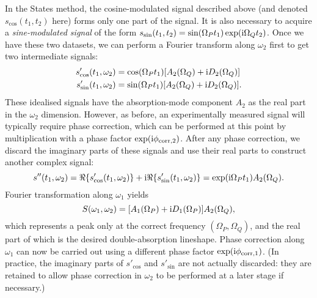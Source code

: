 In the States method, the cosine-modulated signal described above (and denoted $s_\text{cos}(t_1, t_2)$ here) forms only one part of the signal.
It is also necessary to acquire a \textit{sine-modulated signal} of the form $s_\text{sin}(t_1, t_2) = \sin(\Omega_P t_1)\exp(\mathrm{i}\Omega_Q t_2)$.
Once we have these two datasets, we can perform a Fourier transform along $\omega_2$ first to get two intermediate signals:
\begin{align}
    \label{eq:states_1}
    s'_\text{cos}(t_1, \omega_2) &= \cos(\Omega_P t_1) [A_2(\Omega_Q) + \mathrm{i} D_2(\Omega_Q)] \\
    s'_\text{sin}(t_1, \omega_2) &= \sin(\Omega_P t_1) [A_2(\Omega_Q) + \mathrm{i} D_2(\Omega_Q)].
\end{align}
These idealised signals have the absorption-mode component $A_2$ as the real part in the $\omega_2$ dimension.
However, as before, an experimentally measured signal will typically require phase correction, which can be performed at this point by multiplication with a phase factor $\exp(\mathrm{i}\phi_{\text{corr},2})$.
After any phase correction, we discard the imaginary parts of these signals and use their real parts to construct another complex signal:
\begin{equation}
    \label{eq:states_3}
    s''(t_1, \omega_2) = \Re\{s'_\text{cos}(t_1, \omega_2)\} + \mathrm{i} \Re\{s'_\text{sin}(t_1, \omega_2)\} = \exp(\mathrm{i} \Omega_P t_1)A_2(\Omega_Q).
\end{equation}
Fourier transformation along $\omega_1$ yields
\begin{equation}
    \label{eq:states_4}
    S(\omega_1, \omega_2) = [A_1(\Omega_P) + \mathrm{i} D_1(\Omega_P)] A_2(\Omega_Q),
\end{equation}
which represents a peak only at the correct frequency $(\Omega_P, \Omega_Q)$, and the real part of which is the desired double-absorption lineshape.
Phase correction along $\omega_1$ can now be carried out using a different phase factor $\exp(\mathrm{i}\phi_{\text{corr},1})$.
(In practice, the imaginary parts of $s'_\text{cos}$ and $s'_\text{sin}$ are not actually discarded: they are retained to allow phase correction in $\omega_2$ to be performed at a later stage if necessary.)%

